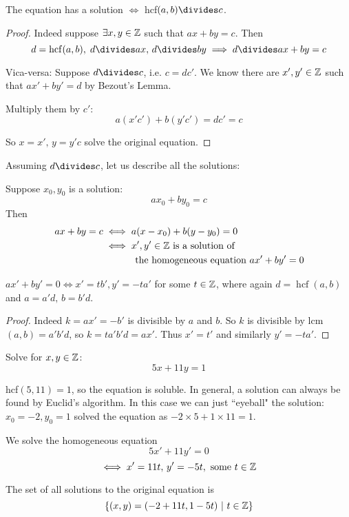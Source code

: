 \documentclass[twoside]{scrartcl}
\DeclareMathOperator{\hcf}{hcf}
\begin{document}
\begin{remark}
The equation has a solution $\iff$ hcf$(a,b) \divides c$. 

\begin{proof}Indeed suppose $\exists x,y \in\mathbb{Z}$ such that $ax + by = c$. Then \[d = \hcf(a,b),\; d \divides ax,\, d\divides by \implies d \divides ax + by = c\] 

Vica-versa: Suppose $d \divides c$, i.e. $c = dc'$. We know there are $x', y' \in\mathbb{Z}$ such that $ax' + by' = d$ by Bezout's Lemma. 

Multiply them by $c'$: 
\[a(x'c') + b(y'c') = dc' = c\]	

So $x = x',\, y = y'c$ solve the original equation.\end{proof}
\end{remark}

Assuming $d \divides c$, let us describe all the solutions:
\begin{remark}
Suppose $x_0, y_0$ is a solution: 
\[ax_0 + by_0 = c\]	
Then 
\[
\begin{aligned}
  ax + by = c &\iff a(x-x_0) + b(y-y_0) = 0\\
  &\iff x',y' \in\mathbb{Z} \text{ is a solution of}\\
  & \qquad \quad \text{ the homogeneous equation } ax' + by' = 0
\end{aligned}
\]
\end{remark}\vspace*{5pt}

\begin{remark}
$ax' + by' = 0 \iff x' = tb', y' = -ta'$ for some $t \in\mathbb{Z}$, where again $d = \hcf(a,b)$ and $a = a'd,\, b = b'd$. 

\begin{proof}Indeed $k = ax' = -b'$ is divisible by $a$ and $b$. So $k$ is divisible by lcm$(a,b) = a'b'd$, so $k= ta'b'd = ax'$. Thus $x' = t'$ and similarly $y' = -ta'$. \end{proof}
\end{remark}\vspace*{5pt}

\begin{example}
Solve for $x,y \in\mathbb{Z}$: 
\[5x + 11y = 1\]	

hcf$(5,11) = 1$, so the equation is soluble. In general, a solution can always be found by Euclid's algorithm. In this case we can just ``eyeball" the solution: $x_0 = -2, y_0 = 1$ solved the equation as $-2 \times 5 + 1 \times 11 = 1$. 

We solve the homogeneous equation
\[5x' + 11y' = 0\]
\[\iff x' = 11t,\, y' = -5t, \text{ some } t \in\mathbb{Z}\]

The set of all solutions to the original equation is 
\[\{(x,y) = (-2 + 11t, 1-5t) ~|~ t \in\mathbb{Z}\}\]
\end{example}\vspace*{5pt}
\end{document}
